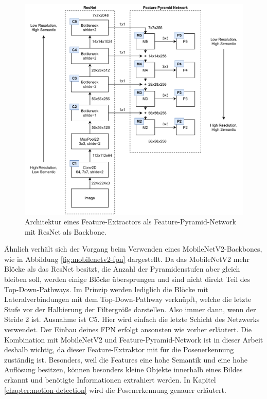 \begin{figure}
    \includegraphics[width=\textwidth]{images/ResNet_FPN.pdf}
    \caption{Architektur eines Feature-Extractors als Feature-Pyramid-Network
    mit ResNet als Backbone.}
    \label{fig:resnet-fpn}
\end{figure}

Ähnlich verhält sich der Vorgang beim Verwenden eines MobileNetV2-Backbones, wie
in Abbildung \ref{fig:mobilenetv2-fpn} dargestellt. Da das MobileNetV2 mehr Blöcke
als das ResNet besitzt, die Anzahl der Pyramidenstufen aber gleich bleiben soll, werden
einige Blöcke übersprungen und sind nicht direkt Teil des Top-Down-Pathways. Im Prinzip
werden lediglich die Blöcke mit Lateralverbindungen mit dem Top-Down-Pathway verknüpft,
welche die letzte Stufe vor der Halbierung der Filtergröße darstellen. Also immer dann,
wenn der Stride 2 ist. Ausnahme ist C5. Hier wird einfach die letzte Schicht des Netzwerks
verwendet. Der Einbau deines FPN erfolgt ansonsten wie vorher erläutert. Die Kombination mit
MobileNetV2 und Feature-Pyramid-Network ist in dieser Arbeit deshalb wichtig, da dieser
Feature-Extraktor mit für die Posenerkennung zuständig ist. Besonders, weil die Features
eine hohe Semantik und eine hohe Auflösung besitzen, können besonders kleine Objekte innerhalb
eines Bildes erkannt und benötigte Informationen extrahiert werden. In Kapitel \ref{chapter:motion-detection}
wird die Posenerkennung genauer erläutert.

